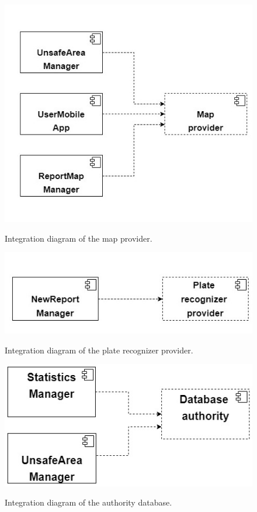 \documentclass[../RASD.tex]{subfiles}
\begin{document}
    \begin{figure}[H]
        \centering
        \includegraphics[scale = 0.8]{assets/integration_diagrams/map_provider_integration.png}\\[1.6 cm]
        \caption[\textit{Integration} Diagram of the map provider]{Integration diagram of the map provider.}
    \end{figure}

    \begin{figure}[H]
        \centering
        \includegraphics[scale = 0.8]{assets/integration_diagrams/plate_provider_integration.png}\\[1.6 cm]
        \caption[\textit{Integration} Diagram of the plate recognizer provider]{Integration diagram of the plate recognizer provider.}
    \end{figure}

    \begin{figure}[H]
        \centering
        \includegraphics[scale = 0.6]{assets/integration_diagrams/db_authority_integration.png}\\[1.6 cm]
        \caption[\textit{Integration} Diagram of the authority database]{Integration diagram of the authority database.}
    \end{figure}
\end{document}
